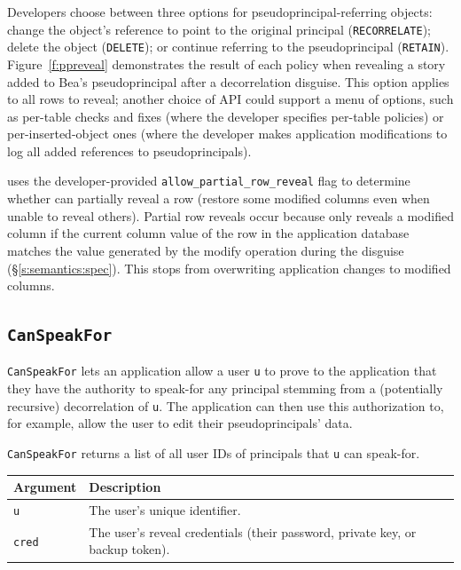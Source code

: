 %
Developers choose between three options for pseudoprincipal-referring objects:
\one{} change the object's reference to point to the original principal
(\texttt{RECORRELATE}); \two{} delete the object (\texttt{DELETE}); or \three{}
continue referring to the pseudoprincipal (\texttt{RETAIN}).
Figure~\ref{f:ppreveal} demonstrates the result of each policy when revealing a
story added to Bea's pseudoprincipal after a decorrelation disguise.
%
This option applies to all rows to reveal; another choice of API could support a
menu of options, such as per-table checks and fixes (where the developer
specifies per-table policies) or per-inserted-object ones (where the developer
makes application modifications to log all added references to
pseudoprincipals).
%

%
\sys uses the developer-provided \texttt{allow\_partial\_row\_reveal} flag to
determine whether \sys can partially reveal a row (\ie restore some modified
columns even when unable to reveal others). 
%
Partial row reveals occur because \sys only reveals a modified column if the
current column value of the row in the application database matches the value
generated by the modify operation during the disguise
(\S\ref{s:semantics:spec}). This stops \sys from overwriting application changes
to modified columns. 
%

%
\subsection{\texttt{CanSpeakFor}}
\label{s:semantics:speakfor}
    \texttt{CanSpeakFor} lets an application allow a user \texttt{u} to prove to
    the application that they have the authority to speak-for any principal
    stemming from a (potentially recursive) decorrelation of \texttt{u}. The
    application can then use this authorization to, for example, allow the user
    to edit their pseudoprincipals' data.
    
    \texttt{CanSpeakFor} returns a list of all user IDs of principals that
    \texttt{u} can speak-for.

\begin{center}
    \begin{longtable}{|m{}|m{}|}
        \hline
        \textbf{Argument} & \textbf{Description} \\
        \hline
             \texttt{u}& The user's unique identifier. \\
        \hline
             \texttt{cred}& The user's reveal credentials (their password, private key, or
    backup token).\\
        \hline
    \end{longtable}
    \end{center}
    \vspace{-24pt}
   
